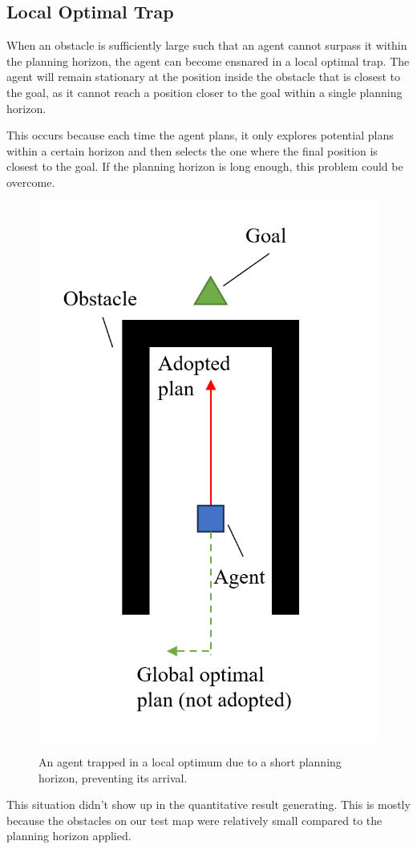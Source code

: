 \subsection{Local Optimal Trap}

When an obstacle is sufficiently large such that an agent cannot surpass it within the planning horizon, the agent can become ensnared in a local optimal trap.
The agent will remain stationary at the position inside the obstacle that is closest to the goal, as it cannot reach a position closer to the goal within a single planning horizon.

This occurs because each time the agent plans, it only explores potential plans within a certain horizon and then selects the one where the final position is closest to the goal.
If the planning horizon is long enough, this problem could be overcome.

\begin{figure}[htbp]
    \centering
    \includegraphics[width = 0.34\linewidth]{figures/Local Optimal Trap.png}
    \label{fig:LocalOptimalTrap}
    \caption{An agent trapped in a local optimum due to a short planning horizon, preventing its arrival.}%
\end{figure}

This situation didn't show up in the quantitative result generating. This is mostly because the obstacles on our test map were relatively small compared to the planning horizon applied.

